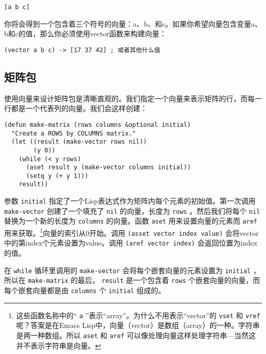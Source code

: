 \begin{verbatim}
[a b c]
\end{verbatim}

你将会得到一个包含着三个符号的向量：a、b、和c。如果你希望向量包含变量a、b和c的值，那么你必须使用vector函数来构建向量：

\begin{verbatim}
(vector a b c) -> [17 37 42] ; 或者其他什么值
\end{verbatim}

\subsection{矩阵包}
\label{section:10-Matrix-Package}

使用向量来设计矩阵包是清晰直观的。我们指定一个向量来表示矩阵的行，而每一行都是一个代表列的向量。我们会这样创建：

\begin{verbatim}
(defun make-matrix (rows columns &optional initial)
  "Create a ROWS by COLUMNS matrix."
  (let ((result (make-vector rows nil))
        (y 0))
    (while (< y rows)
      (aset result y (make-vector columns initial))
      (setq y (+ y 1)))
    result))
\end{verbatim}

参数 \texttt{initial} 指定了一个Lisp表达式作为矩阵内每个元素的初始值。第一次调用 \texttt{make-vector} 创建了一个填充了 \texttt{nil} 的向量，长度为 \texttt{rows} 。然后我们将每个 \texttt{nil} 替换为一个新的长度为 \texttt{columns} 的向量。函数 \texttt{aset} 用来设置向量的元素而 \texttt{aref} 用来获取。\footnote{这些函数名称中的“ \texttt{a} ”表示“array”。为什么不用表示“vector”的 \texttt{vset} 和 \texttt{vref} 呢？答案是在Emacs Lisp中，向量（vector）是数组（array）的一种。字符串是两一种数组。所以 \texttt{aset} 和 \texttt{aref} 可以像处理向量这样处理字符串---当然这并不表示字符串是向量。}向量的索引从0开始。调用 \texttt{(asset vector index value)} 会将vector中的第index个元素设置为value。调用 \texttt{(aref vector index)} 会返回位置为index的值。

在 \texttt{while} 循环里调用的 \texttt{make-vector} 会将每个嵌套向量的元素设置为 \texttt{initial} ，所以在 \texttt{make-matrix} 的最后， \texttt{result} 是一个包含着 \texttt{rows} 个嵌套向量的向量，而每个嵌套向量都是由 \texttt{columns} 个 \texttt{initial} 组成的。

